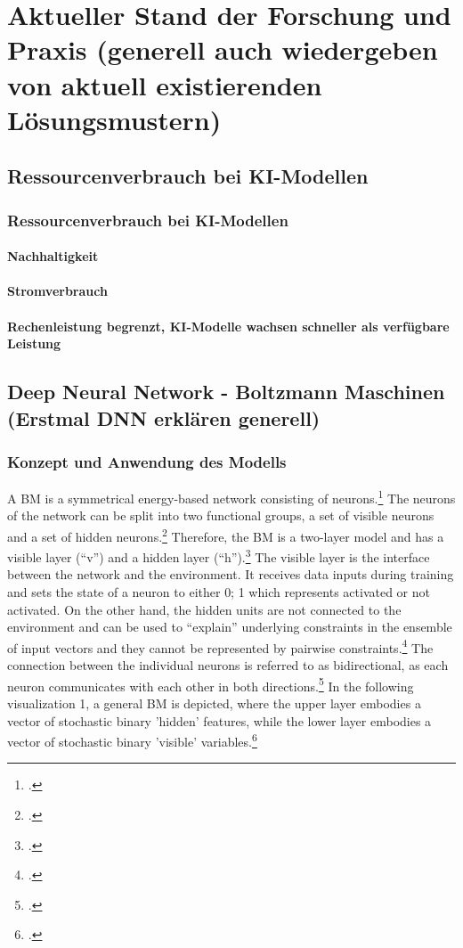 \chapter{Aktueller Stand der Forschung und Praxis (generell auch wiedergeben von aktuell existierenden Lösungsmustern)}

\section{Ressourcenverbrauch bei KI-Modellen}
\subsection{Ressourcenverbrauch bei KI-Modellen}
\subsubsection{Nachhaltigkeit}
\subsubsection{Stromverbrauch}
\subsubsection{Rechenleistung begrenzt, KI-Modelle wachsen schneller als verfügbare Leistung}

\section{Deep Neural Network - Boltzmann Maschinen (Erstmal DNN erklären generell)}
\subsection{Konzept und Anwendung des Modells }

A \ac{BM} is a symmetrical energy-based network consisting of neurons.\footcite[Vgl.][260]{amariInformationGeometryBoltzmann1992}
The neurons of the network can be split into two functional groups, a set of visible neurons and a set of hidden neurons.\footcite[Vgl.][154]{ackleyLearningAlgorithmBoltzmann1985}
Therefore, the \ac{BM} is a two-layer model and has a visible layer (``v'') and a hidden layer (``h'').\footcite[Vgl.][448]{salakhutdinovDeepBoltzmannMachines2009}
The visible layer is the interface between the network and the environment. It receives data inputs during training and sets the state of a neuron to either {0; 1} which represents activated or not activated.
On the other hand, the hidden units are not connected to the environment and can be used to “explain” underlying constraints in the ensemble of input vectors and they cannot be represented by pairwise constraints.\footcite[Vgl.][154]{ackleyLearningAlgorithmBoltzmann1985}
The connection between the individual neurons is referred to as bidirectional, as each neuron communicates with each other in both directions.\footcite[Vgl.][149]{ackleyLearningAlgorithmBoltzmann1985}
In the following visualization 1, a general \ac{BM} is depicted, where the upper layer embodies a vector of stochastic binary 'hidden' features, while the lower layer embodies a vector of stochastic binary 'visible' variables.\footcite[Vgl.][449]{salakhutdinovDeepBoltzmannMachines2009}

